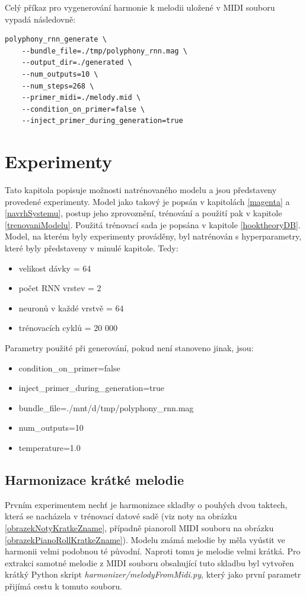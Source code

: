Celý příkaz pro vygenerování harmonie k melodii
uložené v MIDI souboru vypadá následovně:

\begin{verbatim}
polyphony_rnn_generate \
    --bundle_file=./tmp/polyphony_rnn.mag \
    --output_dir=./generated \
    --num_outputs=10 \
    --num_steps=268 \
    --primer_midi=./melody.mid \
    --condition_on_primer=false \
    --inject_primer_during_generation=true    
\end{verbatim}

\chapter{Experimenty}
Tato kapitola popisuje možnosti natrénovaného modelu 
a jsou představeny provedené experimenty.
Model jako takový je popsán v kapitolách \ref{magenta} a \ref{navrhSystemu},
postup jeho zprovoznění, trénování a použití pak v kapitole \ref{trenovaniModelu}.
Použitá trénovací sada je popsána v kapitole \ref{hooktheoryDB}.
Model, na kterém byly experimenty prováděny, 
byl natrénován s hyperparametry, které byly představeny v minulé kapitole.
Tedy:
\begin{itemize}
    \item velikost dávky = 64
    \item počet RNN vrstev = 2
    \item neuronů v každé vrstvě = 64
    \item trénovacích cyklů = 20 000
\end{itemize}
\par
Parametry použité při generování, pokud není stanoveno jinak, jsou:
\begin{itemize}
    \item condition_on_primer=false
    \item inject_primer_during_generation=true
    \item bundle_file=./mnt/d/tmp/polyphony_rnn.mag
    \item num_outputs=10 
    \item temperature=1.0
\end{itemize}

\section{Harmonizace krátké melodie}
Prvním experimentem nechť je harmonizace skladby o pouhých dvou taktech,
která se nacházela v trénovací datové sadě 
(viz noty na obrázku \ref{obrazekNotyKratkeZname},
případně pianoroll MIDI souboru na obrázku \ref{obrazekPianoRollKratkeZname}).
Modelu známá melodie by měla vyústit ve harmonii velmi podobnou té původní.
Naproti tomu je melodie velmi krátká.
Pro extrakci samotné melodie z MIDI souboru obsahující tuto skladbu 
byl vytvořen krátký Python skript \emph{harmonizer/melodyFromMidi.py}, 
který jako první parametr přijímá cestu k tomuto souboru.

